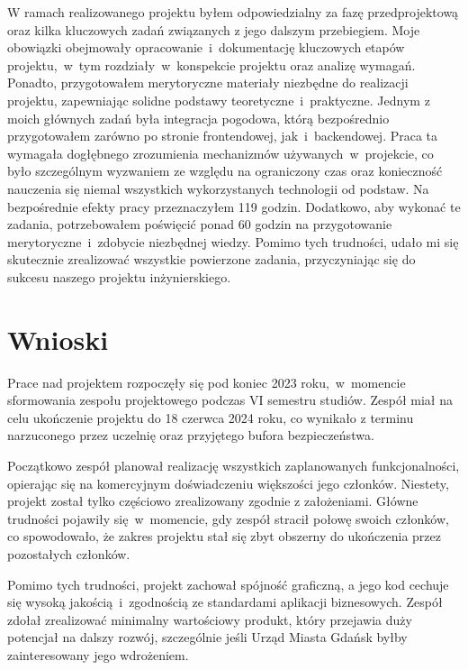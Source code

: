 W ramach realizowanego projektu byłem odpowiedzialny za fazę przedprojektową oraz kilka kluczowych zadań związanych z jego dalszym przebiegiem.\newline
Moje obowiązki obejmowały opracowanie~i~dokumentację kluczowych etapów projektu,~w~tym rozdziały~w~konspekcie projektu oraz analizę wymagań. \newline
Ponadto, przygotowałem merytoryczne materiały niezbędne do realizacji projektu, zapewniając solidne podstawy teoretyczne~i~praktyczne. \newline
Jednym z moich głównych zadań była integracja pogodowa, którą bezpośrednio przygotowałem zarówno po stronie frontendowej, jak~i~backendowej.\newline
\indent Praca ta wymagała dogłębnego zrozumienia mechanizmów używanych~w~projekcie, co było szczególnym wyzwaniem ze względu na ograniczony czas oraz konieczność nauczenia się niemal wszystkich wykorzystanych technologii od podstaw.
Na bezpośrednie efekty pracy przeznaczyłem 119 godzin. Dodatkowo, aby wykonać te zadania, potrzebowałem poświęcić ponad 60 godzin na przygotowanie merytoryczne~i~zdobycie niezbędnej wiedzy.\newline
Pomimo tych trudności, udało mi się skutecznie zrealizować wszystkie powierzone zadania, przyczyniając się do sukcesu naszego projektu inżynierskiego.

\section{Wnioski}\label{sec:wnioski}
Prace nad projektem rozpoczęły się pod koniec 2023 roku,~w~momencie sformowania zespołu projektowego podczas VI semestru studiów.
Zespół miał na celu ukończenie projektu do 18 czerwca 2024 roku, co wynikało z terminu narzuconego przez uczelnię oraz przyjętego bufora bezpieczeństwa.

Początkowo zespół planował realizację wszystkich zaplanowanych funkcjonalności, opierając się na komercyjnym doświadczeniu większości jego członków.
Niestety, projekt został tylko częściowo zrealizowany zgodnie z założeniami.
Główne trudności pojawiły się~w~momencie, gdy zespół stracił połowę swoich członków, co spowodowało, że zakres projektu stał się zbyt obszerny do ukończenia przez pozostałych członków.

Pomimo tych trudności, projekt zachował spójność graficzną, a jego kod cechuje się wysoką jakością~i~zgodnością ze standardami aplikacji biznesowych.
Zespół zdołał zrealizować minimalny wartościowy produkt, który przejawia duży potencjał na dalszy rozwój, szczególnie jeśli Urząd Miasta Gdańsk byłby zainteresowany jego wdrożeniem.

